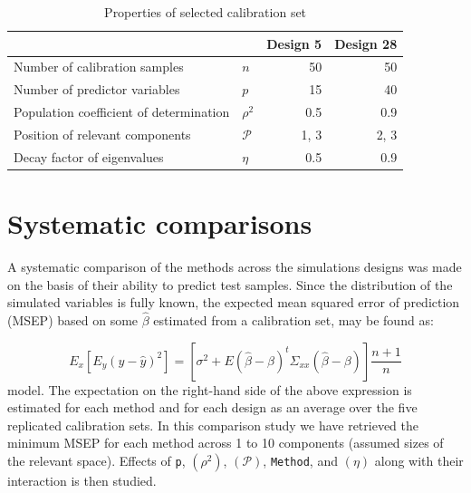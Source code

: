 \documentclass[a4paper, 11pt]{article}
\begin{document}
\begin{table}[ht]
  \centering
  \begin{tabularx}{0.8\textwidth}{Xlrr}
    \hline
                                            &               & Design 5 & Design 28 \\
    \hline\hline
    Number of calibration samples           & $n$           & 50       & 50        \\
    Number of predictor variables           & $p$           & 15       & 40        \\
    Population coefficient of determination & $\rho^2$      & 0.5      & 0.9       \\
    Position of relevant components         & $\mathcal{P}$ & 1, 3     & 2, 3      \\
    Decay factor of eigenvalues           & $\eta$        & 0.5      & 0.9       \\
    \hline
  \end{tabularx}
  \caption{Properties of selected calibration set}
  \label{tab:selected-design}
\end{table}

\section{Systematic comparisons}
A systematic comparison of the methods across the simulations designs was made on the basis of their ability to predict test samples. Since the distribution of the simulated variables is fully known, the expected mean squared error of prediction (MSEP) based on some $\hat{\beta}$ estimated from a calibration set, may be found as:

\begin{equation*}
    E_x\left[E_y\left(y - \hat{y}\right)^2\right] =
    \left[\sigma^2 + E\left(\hat{\beta} - \beta\right)^t\Sigma_{xx}\left(\hat{\beta} - \beta\right)\right]\frac{n+1}{n}
\end{equation*}
model. The expectation on the right-hand side of the above expression is estimated for each method and for each design as an average over the five replicated calibration sets. In this comparison study we have retrieved the minimum MSEP for each method across 1 to 10 components (assumed sizes of the relevant space). Effects of {\tt p}, $(\rho^2)$, $(\mathcal{P})$, {\tt Method}, and $(\eta)$ along with their interaction is then studied.

\end{document}
